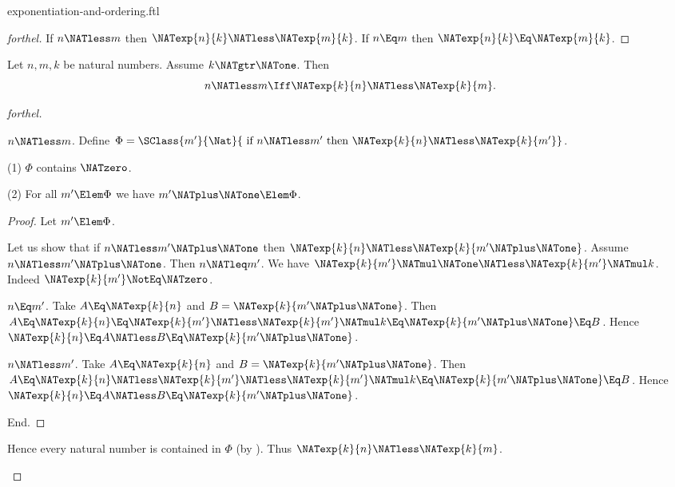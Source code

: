 \documentclass{stex}
\begin{document}
\begin{smodule}{exponentiation-and-ordering.ftl}
\begin{proof}[forthel]
  If $n \NATless m$ then $\NATexp{n}{k} \NATless \NATexp{m}{k}$.
  If $n \Eq m$ then $\NATexp{n}{k} \Eq \NATexp{m}{k}$.
\end{proof}

\begin{proposition}[forthel]
  Let $n, m, k$ be natural numbers.
  Assume $k \NATgtr \NATone$.
  Then \[ n \NATless m \Iff \NATexp{k}{n} \NATless \NATexp{k}{m}. \]
\end{proposition}
\begin{proof}[forthel]
  \begin{case}{$n \NATless m$.}
    Define $\Phi = \SClass{m'}{\Nat}{\text{ if }n \NATless m'\text{ then }\NATexp{k}{n} \NATless \NATexp{k}{m'}}$.

    (1) $\Phi$ contains $\NATzero$.

    (2) For all $m' \Elem \Phi$ we have $m' \NATplus \NATone \Elem \Phi$.
    \begin{proof}
      Let $m' \Elem \Phi$.

      Let us show that if $n \NATless m' \NATplus \NATone$ then $\NATexp{k}{n} \NATless \NATexp{k}{m' \NATplus \NATone}$.
        Assume $n \NATless m' \NATplus \NATone$.
        Then $n \NATleq m'$.
        We have $\NATexp{k}{m'} \NATmul \NATone \NATless \NATexp{k}{m'} \NATmul k$.
        Indeed $\NATexp{k}{m'} \NotEq \NATzero$.

        \begin{case}{$n \Eq m'$.}
          Take $A \Eq \NATexp{k}{n}$ and $B = \NATexp{k}{m' \NATplus \NATone}$. %
          Then $A
            \Eq \NATexp{k}{n}
            \Eq \NATexp{k}{m'}
            \NATless \NATexp{k}{m'} \NATmul k
            \Eq \NATexp{k}{m' \NATplus \NATone}
            \Eq B$.
          Hence $\NATexp{k}{n} \Eq A \NATless B \Eq \NATexp{k}{m' \NATplus \NATone}$.
        \end{case}

        \begin{case}{$n \NATless m'$.}
          Take $A \Eq \NATexp{k}{n}$ and $B = \NATexp{k}{m' \NATplus \NATone}$. %
          Then $A
            \Eq \NATexp{k}{n}
            \NATless \NATexp{k}{m'}
            \NATless \NATexp{k}{m'} \NATmul k
            \Eq \NATexp{k}{m' \NATplus \NATone}
            \Eq B$.
          Hence $\NATexp{k}{n} \Eq A \NATless B \Eq \NATexp{k}{m' \NATplus \NATone}$.
        \end{case}
      End.
    \end{proof}

    Hence every natural number is contained in $\Phi$ (by ).
    Thus $\NATexp{k}{n} \NATless \NATexp{k}{m}$.
  \end{case}


\end{proof}
\end{smodule}
\end{document}
